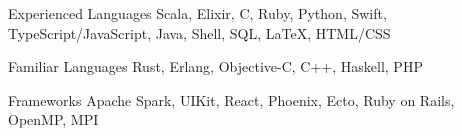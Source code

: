 

\begin{cvskills}

  \cvskill
  {Experienced Languages} %
  {Scala, Elixir, C, Ruby, Python, Swift, TypeScript/JavaScript, Java, Shell, SQL, \LaTeX, HTML/CSS} %

  \cvskill
  {Familiar Languages} %
  {Rust, Erlang, Objective-C, C++, Haskell, PHP} %

  \cvskill
  {Frameworks} %
  {Apache Spark, UIKit, React, Phoenix, Ecto, Ruby on Rails, OpenMP, MPI} %



\end{cvskills}
